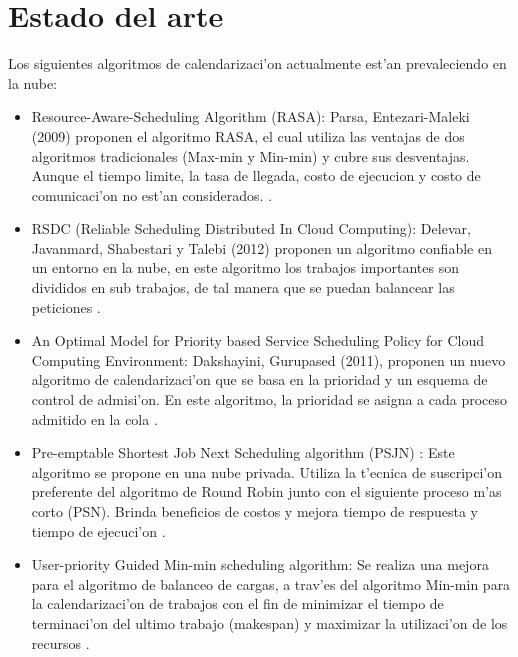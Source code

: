 \section*{Estado del arte}

Los siguientes algoritmos de calendarizaci'on actualmente est'an prevaleciendo en la nube:
\begin{itemize}
\item Resource-Aware-Scheduling Algorithm (RASA): Parsa, Entezari-Maleki (2009) proponen el algoritmo RASA, el cual utiliza las ventajas de dos algoritmos tradicionales (Max-min y Min-min) y cubre sus desventajas. Aunque el tiempo limite, la tasa de llegada, costo de ejecucion y costo de comunicaci'on no est'an considerados. \cite{parsa2009rasa}.


\item RSDC (Reliable Scheduling Distributed In Cloud Computing): Delevar, Javanmard, Shabestari y Talebi (2012) proponen un algoritmo confiable en un entorno en la nube, en este algoritmo los trabajos importantes son divididos en sub trabajos, de tal manera que se puedan balancear las peticiones \cite{delavar2012rsdc}.


\item An Optimal Model for Priority based Service Scheduling Policy for Cloud Computing Environment: Dakshayini, Gurupased (2011), proponen un nuevo algoritmo de calendarizaci'on que se basa en la prioridad y un esquema de control de admisi'on. En este algoritmo, la prioridad se asigna a cada proceso admitido en la cola \cite{dakshayini2011optimal}. 


\item Pre-emptable Shortest Job Next Scheduling algorithm (PSJN) :  Este algoritmo se propone en una nube privada. Utiliza la t'ecnica de suscripci'on preferente del algoritmo de Round Robin junto con el siguiente proceso m'as corto (PSN). Brinda beneficios de costos y mejora tiempo de respuesta y tiempo de ejecuci'on \cite{nishant}. 


\item User-priority Guided Min-min scheduling algorithm: Se realiza una mejora para el algoritmo de balanceo de cargas, a trav'es del algoritmo Min-min para la calendarizaci'on de trabajos con el fin de minimizar el tiempo de terminaci'on del ultimo trabajo (makespan) y maximizar la utilizaci'on de los recursos \cite{chen2013user}. 
\end{itemize}


